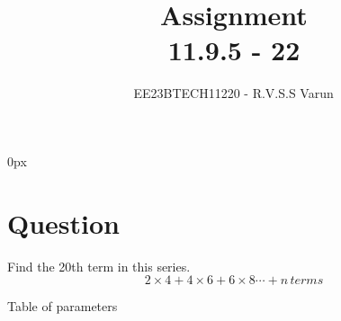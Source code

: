\documentclass[journal,12pt,twocolumn]{IEEEtran}
\theoremstyle{remark}
\begin{document}
\parindent 0px


\title{Assignment\\[1ex]11.9.5 - 22}
\author{EE23BTECH11220 - R.V.S.S Varun$^{}$%
}
\maketitle
\newpage
\bigskip

\renewcommand{\thefigure}{\theenumi}
\renewcommand{\thetable}{\theenumi}
\section*{Question}
Find the 20th term in this series.\\
$$2\times4+4\times6+6\times8\cdots+n\,terms$$ 

\fi


\begin{table}[h]
    \centering
    
    \caption{Table of parameters}
    \label{tab:11.9.5.22.1}
\end{table}
\end{document}
